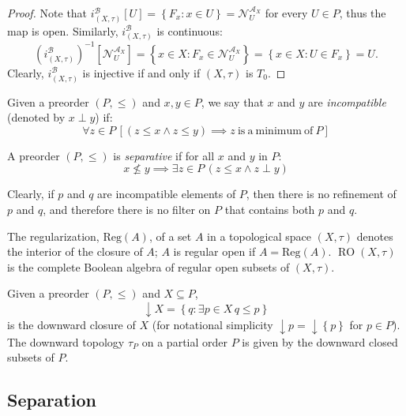 \documentclass{article}
\newcommand{\aaa}{\mathcal{A} }
\theoremstyle{plain}
\theoremstyle{definition}
\theoremstyle{remark}
\DeclareMathOperator{\RO}{RO}
\newcommand{\Reg}[1]{\text{Reg}\left(#1\right)}
\newcommand{\bp}[1]{\left\lbrace #1 \right\rbrace}
\newcommand{\0}{\mathbbm 0}
\newcommand{\1}{\mathbbm 1}
\newcommand{\2}{\mathbbm 2}
\begin{document}
\begin{proof} 
Note that $i_{(X,\tau)}^\mathcal{B}[U]=\bp{F_x: x \in U}=\mathcal{N}_U^{\aaa_X}$ for every $U \in P$, thus the map is open. Similarly, $i_{(X,\tau)}^\mathcal{B}$ is continuous: 
\[
(i_{(X,\tau)}^\mathcal{B})^{-1}[\mathcal{N}_U^{\aaa_X}]=\bp{x \in X: F_x \in\mathcal{N}_U^{\aaa_X}}=\bp{x \in X: U \in F_x}=U.
\] 
Clearly,  $i_{(X,\tau)}^\mathcal{B}$ is injective if and only if $(X,\tau)$ is $T_0$. 
\end{proof}

Given a preorder $(P, \le)$  and $x, y \in P$, we say that $x$ and $y$ are \emph{incompatible} (denoted by $x \perp y$) if:
\[
\forall z \in P\,[ (z \leq x \wedge z \leq y) \implies z \mathrm{ \ is \ a\ minimum \ of\ } P] 
\]


A preorder $(P, \le)$ is \emph{separative} if for all $x$ and $y$ in $P$: 
\begin{equation*}
        x \not \leq y \implies \exists z \in P\,( z \leq x \wedge z \perp y) 
    \end{equation*} 

Clearly, if $p$ and $q$ are incompatible elements of $P$, then there is no refinement of $p$ and $q$, and therefore there is no filter on $P$ that contains both $p$ and $q$.

The regularization, $\Reg{A}$, of a set $A$ in a topological space $(X,\tau)$ denotes the interior of the closure of $A$; $A$ is regular open if $A=\Reg{A}$.
$\RO(X,\tau)$ is the complete Boolean algebra of regular open subsets of $(X,\tau)$.

Given a preorder $(P,\le)$ and $X\subseteq P$, 
\[
\downarrow X=\bp{q:\exists p\in X\, q\le p}
\]
is the downward closure of $X$ (for notational simplicity
$\downarrow p=\downarrow\bp{p}$ for $p\in P$).
The downward topology $\tau_P$ on a partial order $P$ is given by the downward closed subsets of $P$.

 
\subsection{Separation}
\label{subsec:separation}
\end{document}
